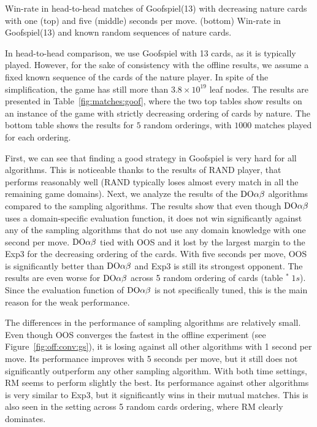 \begin{table}
\begin{scriptsize}
\end{scriptsize}
\caption{Win-rate in head-to-head matches of Goofspiel(13) with decreasing nature cards with one (top) and five (middle) seconds per move. (bottom) Win-rate in Goofspiel(13) and known random sequences of nature cards.}\label{fig:matches:goof}
\end{table}

In head-to-head comparison, we use Goofspiel with 13 cards, as it is typically played. However, for the sake of consistency with the offline results, we assume a fixed known sequence of the cards of the nature player. In spite of the simplification, the game has still more than $3.8\times 10^{19}$ leaf nodes. The results are presented in Table~\ref{fig:matches:goof}, where the two top tables show results on an instance of the game with strictly decreasing ordering of cards by nature. The bottom table shows the results for $5$ random orderings, with $1000$ matches played for each ordering.

First, we can see that finding a good strategy in Goofspiel is very hard for all algorithms.
This is noticeable thanks to the results of RAND player, that performs reasonably well (RAND typically loses almost every match in all the remaining game domains). 
Next, we analyze the results of the $\textrm{DO}\alpha\beta$ algorithms compared to the sampling algorithms.
The results show that even though $\textrm{DO}\alpha\beta$ uses a domain-specific evaluation function, it does not win significantly against any of the sampling algorithms that do not use any domain knowledge with one second per move. $\textrm{DO}\alpha\beta$ tied with OOS and it lost by the largest margin to the Exp3 for the decreasing ordering of the cards. With five seconds per move, OOS is significantly better than $\textrm{DO}\alpha\beta$ and Exp3 is still its strongest opponent. The results are even worse for $\textrm{DO}\alpha\beta$ across 5 random ordering of cards (table $^*\;1s$). Since the evaluation function of $\textrm{DO}\alpha\beta$ is not specifically tuned, this is the main reason for the weak performance. 

The differences in the performance of sampling algorithms are relatively small. Even though OOS converges the fastest in the offline experiment (see Figure~\ref{fig:off:conv:gs}), it is losing against all other algorithms with 1 second per move. Its performance improves with 5 seconds per move, but it still does not significantly outperform any other sampling algorithm. With both time settings, RM seems to perform slightly the best. Its performance against other algorithms is very similar to Exp3, but it significantly wins in their mutual matches.
This is also seen in the setting across 5 random cards ordering, where RM clearly dominates.

